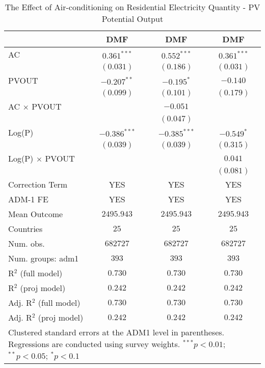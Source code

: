 
\begin{table}[htbp]
\caption{The Effect of Air-conditioning on Residential Electricity Quantity - PV Potential Output}
\begin{center}
\begin{tabular}{l c c c}
\hline
 & DMF & DMF & DMF \\
\hline
AC                      & $0.361^{***}$  & $0.552^{***}$  & $0.361^{***}$ \\
                        & $(0.031)$      & $(0.186)$      & $(0.031)$     \\
PVOUT                   & $-0.207^{**}$  & $-0.195^{*}$   & $-0.140$      \\
                        & $(0.099)$      & $(0.101)$      & $(0.179)$     \\
AC $\times$ PVOUT       &                & $-0.051$       &               \\
                        &                & $(0.047)$      &               \\
Log(P)                  & $-0.386^{***}$ & $-0.385^{***}$ & $-0.549^{*}$  \\
                        & $(0.039)$      & $(0.039)$      & $(0.315)$     \\
Log(P) $\times$ PVOUT   &                &                & $0.041$       \\
                        &                &                & $(0.081)$     \\
\hline
Correction Term         & YES            & YES            & YES           \\
ADM-1 FE                & YES            & YES            & YES           \\
Mean Outcome            & $2495.943$     & $2495.943$     & $2495.943$    \\
Countries               & $25$           & $25$           & $25$          \\
Num. obs.               & $682727$       & $682727$       & $682727$      \\
Num. groups: adm1       & $393$          & $393$          & $393$         \\
R$^2$ (full model)      & $0.730$        & $0.730$        & $0.730$       \\
R$^2$ (proj model)      & $0.242$        & $0.242$        & $0.242$       \\
Adj. R$^2$ (full model) & $0.730$        & $0.730$        & $0.730$       \\
Adj. R$^2$ (proj model) & $0.242$        & $0.242$        & $0.242$       \\
\hline
\multicolumn{4}{l}{\scriptsize{Clustered standard errors at the ADM1 level in parentheses. Regressions are conducted using survey weights. $^{***}p<0.01$; $^{**}p<0.05$; $^{*}p<0.1$}}
\end{tabular}
\label{main: tableA11}
\end{center}
\end{table}
